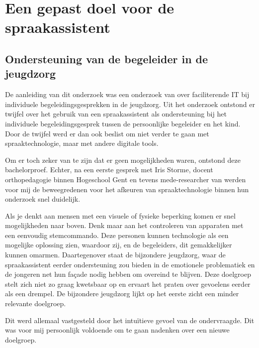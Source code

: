 
\chapter{Een gepast doel voor de spraakassistent}
\label{ch:zoektocht}

\section{Ondersteuning van de begeleider in de jeugdzorg}
\label{ondersteuning van de begeleider in de jeugdzorg}
De aanleiding van dit onderzoek was een onderzoek van \textcite{Buysse} over faciliterende IT bij individuele begeleidingsgesprekken in de jeugdzorg. Uit het onderzoek ontstond er twijfel over het gebruik van een spraakassistent als ondersteuning bij het individuele begeleidingsgesprek tussen de persoonlijke begeleider en het kind. Door de twijfel werd er dan ook beslist om niet verder te gaan met spraaktechnologie, maar met andere digitale tools.

Om er toch zeker van te zijn dat er geen mogelijkheden waren, ontstond deze bachelorproef. Echter, na een eerste gesprek met Iris Storme, docent orthopedagogie binnen Hogeschool Gent en tevens mede-researcher van \textcite{Buysse} werden voor mij de beweegredenen voor het afkeuren van spraaktechnologie binnen hun onderzoek snel duidelijk. 

Als je denkt aan mensen met een visuele of fysieke beperking komen er snel mogelijkheden naar boven. Denk maar aan het controleren van apparaten met een eenvoudig stemcommando. Deze personen kunnen technologie als een mogelijke oplossing zien, waardoor zij, en de begeleiders, dit gemakkelijker kunnen omarmen.
Daartegenover staat de bijzondere jeugdzorg, waar de spraakassistent eerder ondersteuning zou bieden in de emotionele problematiek en de jongeren net hun façade nodig hebben om overeind te blijven. Deze doelgroep stelt zich niet zo graag kwetsbaar op en ervaart het praten over gevoelens eerder als een drempel. De bijzondere jeugdzorg lijkt op het eerste zicht een minder relevante doelgroep.

Dit werd allemaal vastgesteld door het intuïtieve gevoel van de ondervraagde. Dit was voor mij persoonlijk voldoende om te gaan nadenken over een nieuwe doelgroep.

